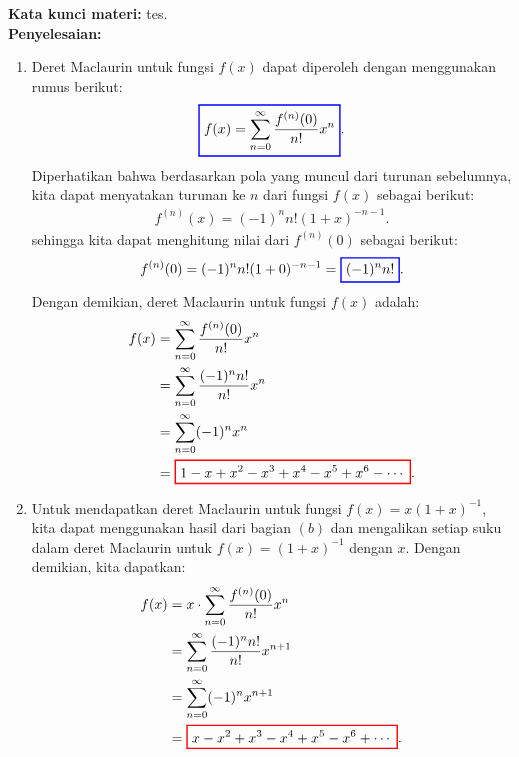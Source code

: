 \documentclass[10pt,openany,a4paper]{article}
\theoremstyle{definition}
\theoremstyle{definition}
\theoremstyle{plain}
\newenvironment{jawab}[2][tes]{
\textbf{Kata kunci materi:} #1.\\
\textbf{Penyelesaian:} #2
}{}
\newenvironment{jawaban}[2][tes]{
\colorlet{oldcolor}{.}
        \color{red}
        \setlength{\fboxrule}{1pt}\boxed{\color{oldcolor}#2}\color{oldcolor}.
}{}
\begin{document}
\begin{enumerate}
\begin{jawab}
{\begin{enumerate}
                        \item Deret Maclaurin untuk fungsi $f(x)$ dapat diperoleh dengan menggunakan rumus berikut:
                        \begin{align*}
                            \colorlet{oldcolor}{.}
        \color{blue}        \setlength{\fboxrule}{1pt} \boxed{\color{oldcolor}f(x) = \sum_{n=0}^{\infty} \frac{f^{(n)}(0)}{n!} x^n}\color{oldcolor}.
                        \end{align*}
                        Diperhatikan bahwa berdasarkan pola yang muncul dari turunan sebelumnya, kita dapat menyatakan turunan ke $n$ dari fungsi $f(x)$ sebagai berikut:
                        \begin{align*}
                            f^{(n)}(x) = (-1)^n n! (1+x)^{-n-1}.
                        \end{align*}
                        sehingga kita dapat menghitung nilai dari $f^{(n)}(0)$ sebagai berikut:
                        \begin{align*}
                            f^{(n)}(0) = (-1)^n n! (1+0)^{-n-1} = \colorlet{oldcolor}{.}
        \color{blue}        \setlength{\fboxrule}{1pt} \boxed{\color{oldcolor}(-1)^n n!}\color{oldcolor}.
                        \end{align*}
                        Dengan demikian, deret Maclaurin untuk fungsi $f(x)$ adalah:
                        \begin{align*}
                            f(x) &= \sum_{n=0}^{\infty} \frac{f^{(n)}(0)}{n!} x^n \\
                            &= \sum_{n=0}^{\infty} \frac{(-1)^n n!}{n!} x^n \\
                            &= \sum_{n=0}^{\infty} (-1)^n x^n \\
                            &= \begin{jawaban}{1 - x + x^2 - x^3 + x^4 - x^5 + x^6 - \cdots}\end{jawaban}
                        \end{align*}
                        \item Untuk mendapatkan deret Maclaurin untuk fungsi $f(x)=x(1+x)^{-1}$, kita dapat menggunakan hasil dari bagian $(b)$ dan mengalikan setiap suku dalam deret Maclaurin untuk $f(x)=(1+x)^{-1}$ dengan $x$. Dengan demikian, kita dapatkan:
                        \begin{align*}
                            f(x) &= x \cdot \sum_{n=0}^{\infty} \frac{f^{(n)}(0)}{n!} x^n \\
                            &= \sum_{n=0}^{\infty} \frac{(-1)^n n!}{n!} x^{n+1} \\
                            &= \sum_{n=0}^{\infty} (-1)^n x^{n+1} \\
                            &= \begin{jawaban}{x - x^2 + x^3 - x^4 + x^5 - x^6 + \cdots}\end{jawaban}
                        \end{align*}
                

\end{enumerate}}
\end{jawab}
\end{enumerate}
\end{document}
